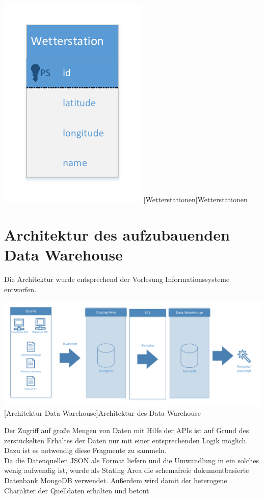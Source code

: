 \documentclass[a4paper,12pt]{scrartcl}
\makeatletter
\def\ScaleIfNeeded{%
\ifdim\Gin@nat@width>\linewidth
\linewidth
\else
\Gin@nat@width
\fi
}
\makeatother
\begin{document}
\begin{center}
\centering
\includegraphics[width=\ScaleIfNeeded]{../Wetterstation.pdf}%
[Wetterstationen]{Wetterstationen}%
\end{center}


\section{Architektur des aufzubauenden Data Warehouse}

Die Architektur wurde entsprechend der Vorlesung Informationssysteme entworfen.

\begin{center}
\centering
\includegraphics[width=\ScaleIfNeeded]{../Architektur.pdf}%
[Architektur Data Warehouse]{Architektur des Data Warehouse}%
\end{center}

Der Zugriff auf große Mengen von Daten mit Hilfe der APIs ist auf Grund des zerstückelten Erhaltes der Daten nur mit einer entsprechenden Logik möglich. Dazu ist es notwendig diese Fragmente zu sammeln.\\
Da die Datenquellen JSON als Format liefern und die Umwandlung in ein solches wenig aufwendig ist, wurde als Stating Area die schemafreie dokumentbasierte Datenbank MongoDB verwendet. Außerdem wird damit der heterogene Charakter der Quelldaten erhalten und betont.\\
\end{document}
